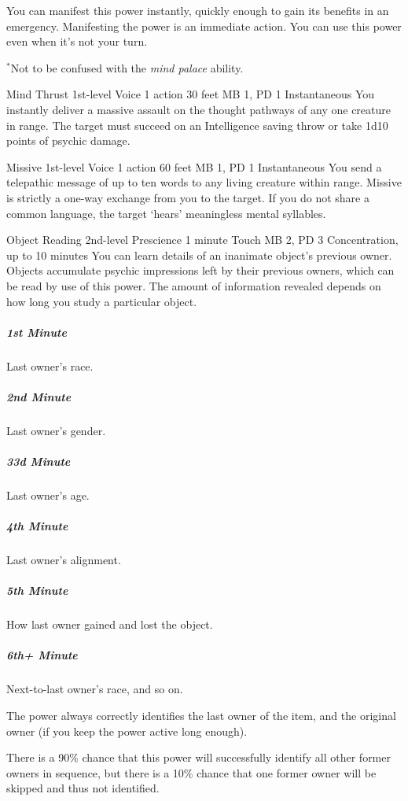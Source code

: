   You can manifest this power instantly,
  quickly enough to gain its benefits in an emergency.
  Manifesting the power is an immediate action.
  You can use this power even when it's not your turn.

  $^*$Not to be confused with the \emph{mind palace} ability.

\DndPowerHeader%
  {Mind Thrust}
  {1st-level Voice}
  {1 action}
  {30 feet}
  {MB 1, PD 1}
  {Instantaneous}
You instantly deliver a massive assault on the thought pathways
of any one creature in range.
The target must succeed on an Intelligence saving throw
or take 1d10 points of psychic damage.

\DndPowerHeader%
  {Missive}
  {1st-level Voice}
  {1 action}
  {60 feet}
  {MB 1, PD 1}
  {Instantaneous}
  You send a telepathic message of up to ten words to
  any living creature within range.
  Missive is strictly a one-way exchange from you to the target.
  If you do not share a common language,
  the target `hears' meaningless mental syllables.

\DndPowerHeader%
  {Object Reading}
  {2nd-level Prescience}
  {1 minute}
  {Touch}
  {MB 2, PD 3}
  {Concentration, up to 10 minutes}
  You can learn details of an inanimate object's previous owner.
  Objects accumulate psychic impressions
  left by their previous owners,
  which can be read by use of this power.
  The amount of information revealed depends
  on how long you study a particular object.

  \subparagraph{1st Minute}
    Last owner's race.
  \subparagraph{2nd Minute}
    Last owner's gender.
  \subparagraph{33d Minute}
    Last owner's age.
  \subparagraph{4th Minute}
    Last owner's alignment.
  \subparagraph{5th Minute}
    How last owner gained and lost the object.
  \subparagraph{6th+ Minute}
    Next-to-last owner's race, and so on.
  
  The power always correctly identifies the last owner of the item,
  and the original owner
  (if you keep the power active long enough).
  
  There is a 90\% chance
  that this power will successfully identify all other former owners
  in sequence,
  but there is a 10\% chance that one former owner
  will be skipped and thus not identified.
  
